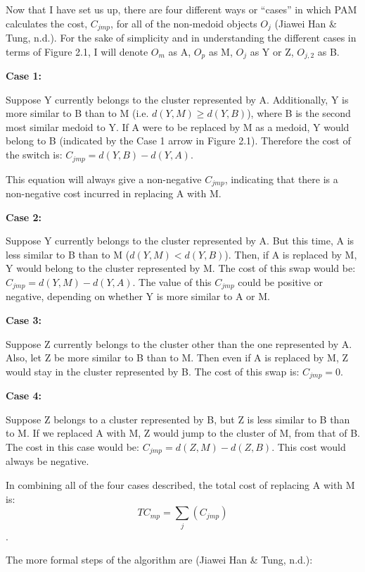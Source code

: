 \documentclass[12pt,twoside]{amherstthesis}
\begin{document}
  Now that I have set us up, there are four different ways or ``cases'' in
  which PAM calculates the cost, \(C_{jmp}\), for all of the non-medoid
  objects \(O_j\) (Jiawei Han \& Tung, n.d.). For the sake of simplicity
  and in understanding the different cases in terms of Figure 2.1, I will
  denote \(O_m\) as A, \(O_p\) as M, \(O_j\) as Y or Z, \(O_{j,2}\) as B.
  
  \textbf{Case 1:}
  
  Suppose Y currently belongs to the cluster represented by A.
  Additionally, Y is more similar to B than to M (i.e.
  \(d(Y, M) \geq d(Y, B)\)), where B is the second most similar medoid to
  Y. If A were to be replaced by M as a medoid, Y would belong to B
  (indicated by the Case 1 arrow in Figure 2.1). Therefore the cost of the
  switch is: \(C_{jmp} = d(Y, B) - d(Y, A)\).
  
  This equation will always give a non-negative \(C_{jmp}\), indicating
  that there is a non-negative cost incurred in replacing A with M.
  
  \textbf{Case 2:}
  
  Suppose Y currently belongs to the cluster represented by A. But this
  time, A is less similar to B than to M (\(d(Y, M) < d(Y, B)\)). Then, if
  A is replaced by M, Y would belong to the cluster represented by M. The
  cost of this swap would be: \(C_{jmp} = d(Y, M) - d(Y, A)\). The value
  of this \(C_{jmp}\) could be positive or negative, depending on whether
  Y is more similar to A or M.
  
  \textbf{Case 3:}
  
  Suppose Z currently belongs to the cluster other than the one
  represented by A. Also, let Z be more similar to B than to M. Then even
  if A is replaced by M, Z would stay in the cluster represented by B. The
  cost of this swap is: \(C_{jmp} = 0\).
  
  \textbf{Case 4:}
  
  Suppose Z belongs to a cluster represented by B, but Z is less similar
  to B than to M. If we replaced A with M, Z would jump to the cluster of
  M, from that of B. The cost in this case would be:
  \(C_{jmp} = d(Z, M) - d(Z, B)\). This cost would always be negative.
  
  In combining all of the four cases described, the total cost of
  replacing A with M is: \[ TC_{mp} = \sum_j(C_{jmp}) \].
  
  The more formal steps of the algorithm are (Jiawei Han \& Tung, n.d.):
  
\end{document}
